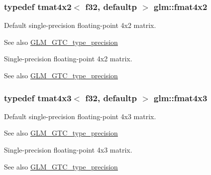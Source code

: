 \subsubsection[{fmat4x2}]{\setlength{\rightskip}{0pt plus 5cm}typedef tmat4x2$<$ f32, defaultp $>$ {\bf glm\+::fmat4x2}}\label{group__gtc__type__precision_ga9325d382b334066a4c90a814c9040359}
Default single-\/precision floating-\/point 4x2 matrix. \begin{DoxySeeAlso}{See also}
\hyperlink{group__gtc__type__precision}{G\+L\+M\+\_\+\+G\+T\+C\+\_\+type\+\_\+precision}
\end{DoxySeeAlso}
Single-\/precision floating-\/point 4x2 matrix. \begin{DoxySeeAlso}{See also}
\hyperlink{group__gtc__type__precision}{G\+L\+M\+\_\+\+G\+T\+C\+\_\+type\+\_\+precision} 
\end{DoxySeeAlso}
\hypertarget{group__gtc__type__precision_ga89195b7b13a41b0f1d34a962d1f66bfb}{}
\subsubsection[{fmat4x3}]{\setlength{\rightskip}{0pt plus 5cm}typedef tmat4x3$<$ f32, defaultp $>$ {\bf glm\+::fmat4x3}}\label{group__gtc__type__precision_ga89195b7b13a41b0f1d34a962d1f66bfb}
Default single-\/precision floating-\/point 4x3 matrix. \begin{DoxySeeAlso}{See also}
\hyperlink{group__gtc__type__precision}{G\+L\+M\+\_\+\+G\+T\+C\+\_\+type\+\_\+precision}
\end{DoxySeeAlso}
Single-\/precision floating-\/point 4x3 matrix. \begin{DoxySeeAlso}{See also}
\hyperlink{group__gtc__type__precision}{G\+L\+M\+\_\+\+G\+T\+C\+\_\+type\+\_\+precision} 
\end{DoxySeeAlso}
\hypertarget{group__gtc__type__precision_ga16b508b75c7213ba6b24055ff3b7503d}{}
